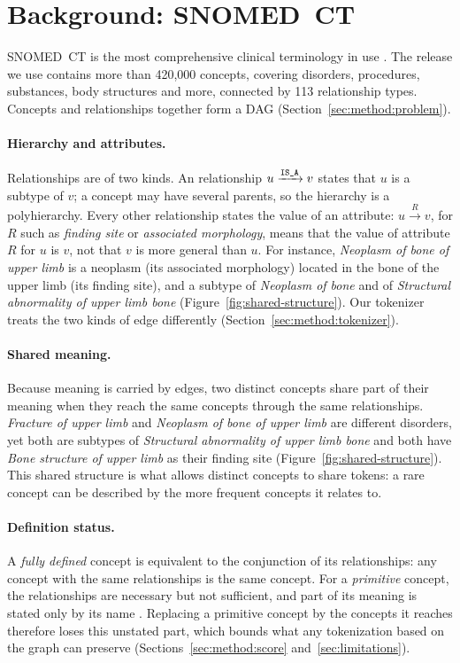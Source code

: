\section{Background: SNOMED~CT}
\label{sec:background}
\label{sec:snomed}

SNOMED~CT is the most comprehensive clinical terminology in use \cite{snomed2024starter}.
The release we use contains more than 420,000 concepts, covering disorders, procedures, substances, body structures and more, connected by 113 relationship types.
Concepts and relationships together form a DAG (Section~\ref{sec:method:problem}).

\paragraph{Hierarchy and attributes.}
Relationships are of two kinds.
An \isa{} relationship $u \xrightarrow{\texttt{IS\_A}} v$ states that $u$ is a subtype of $v$; a concept may have several parents, so the hierarchy is a polyhierarchy.
Every other relationship states the value of an attribute: $u \xrightarrow{R} v$, for $R$ such as \emph{finding site} or \emph{associated morphology}, means that the value of attribute $R$ for $u$ is $v$, not that $v$ is more general than $u$.
For instance, \emph{Neoplasm of bone of upper limb} is a neoplasm (its associated morphology) located in the bone of the upper limb (its finding site), and a subtype of \emph{Neoplasm of bone} and of \emph{Structural abnormality of upper limb bone} (Figure~\ref{fig:shared-structure}).
Our tokenizer treats the two kinds of edge differently (Section~\ref{sec:method:tokenizer}).

\paragraph{Shared meaning.}
Because meaning is carried by edges, two distinct concepts share part of their meaning when they reach the same concepts through the same relationships.
\emph{Fracture of upper limb} and \emph{Neoplasm of bone of upper limb} are different disorders, yet both are subtypes of \emph{Structural abnormality of upper limb bone} and both have \emph{Bone structure of upper limb} as their finding site (Figure~\ref{fig:shared-structure}).
This shared structure is what allows distinct concepts to share tokens: a rare concept can be described by the more frequent concepts it relates to.

\paragraph{Definition status.}
A \emph{fully defined} concept is equivalent to the conjunction of its relationships: any concept with the same relationships is the same concept.
For a \emph{primitive} concept, the relationships are necessary but not sufficient, and part of its meaning is stated only by its name \cite{snomed2024editorial}.
Replacing a primitive concept by the concepts it reaches therefore loses this unstated part, which bounds what any tokenization based on the graph can preserve (Sections~\ref{sec:method:score} and~\ref{sec:limitations}).

